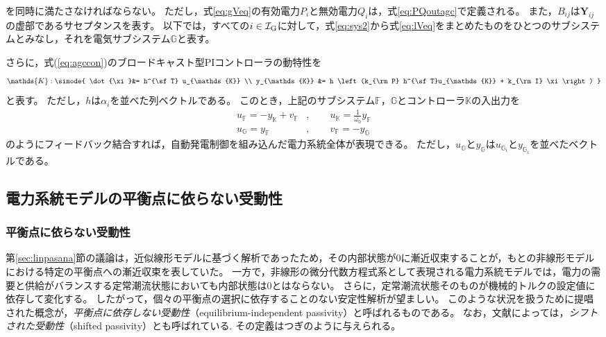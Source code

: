 \documentclass[tombow,dvipdfmx]{corona-a5-1.1}
\begin{document}
を同時に満たさなければならない。
ただし，式\ref{eq:gVeq}の有効電力$P_i$と無効電力$Q_i$は，式\ref{eq:PQoutagc}で定義される。
また，$B_{ij}$は$\bm{Y}_{ij}$の虚部であるサセプタンスを表す。
以下では，すべての$i \in \mathcal{I}_{\rm G}$に対して，式\ref{eq:sys2}から式\ref{eq:lVeq}をまとめたものをひとつのサブシステムとみなし，それを電気サブシステム$\mathds{G}$と表す。

さらに，式(\ref{eq:agccon})のブロードキャスト型PIコントローラの動特性を
\begin{align}\label{eq:condsK}
\mathds{K}: \simode{
\dot{\xi}&=  h^{\sf T} u_{\mathds{K}} \\
y_{\mathds{K}} &= h \left(k_{\rm P} h^{\sf T}u_{\mathds{K}} +  k_{\rm I} \xi \right)
}
\end{align}
と表す。
ただし，$h$は$\alpha_i$を並べた列ベクトルである。
このとき，上記のサブシステム$\mathds{F}$，$\mathds{G}$とコントローラ$\mathds{K}$の入出力を
\begin{subequations}\label{eq:connds}
\begin{align}
u_{\mathds{F}} = - y_{\mathds{K}} + v_{\mathds{F}}&
,\qquad u_{\mathds{K}} = \frac{1}{\omega_0} y_{\mathds{F}}	\label{eq:connds1}
\\
u_{\mathds{G}} = y_{\mathds{F}}&
,\qquad
v_{\mathds{F}} = - y_{\mathds{G}}		\label{eq:connds2}
\end{align}
\end{subequations}
のようにフィードバック結合すれば，自動発電制御を組み込んだ電力系統全体が表現できる。
ただし，$u_{\mathds{G}}$と$y_{\mathds{G}}$は$u_{\mathds{G}_i}$と$y_{\mathds{G}_i}$を並べたベクトルである。



\subsection{電力系統モデルの平衡点に依らない受動性\advanced}

\subsubsection{平衡点に依らない受動性}

第\ref{sec:linpasana}節の議論は，近似線形モデルに基づく解析であったため，その内部状態が0に漸近収束することが，もとの非線形モデルにおける特定の平衡点への漸近収束を表していた。
一方で，非線形の微分代数方程式系として表現される電力系統モデルでは，電力の需要と供給がバランスする定常潮流状態においても内部状態は0とはならない。
さらに，定常潮流状態そのものが機械的トルクの設定値に依存して変化する。
したがって，個々の平衡点の選択に依存することのない安定性解析が望ましい。
このような状況を扱うために提唱された概念が，\emph{平衡点に依存しない受動性}（equilibrium-independent passivity）と呼ばれるものである\cite{hines2011equilibrium,simpson2019equilibrium}。
なお，文献によっては，\emph{シフトされた受動性}（shifted passivity）とも呼ばれている\cite{monshizadeh2019conditions}.
その定義はつぎのように与えられる。
\end{document}
